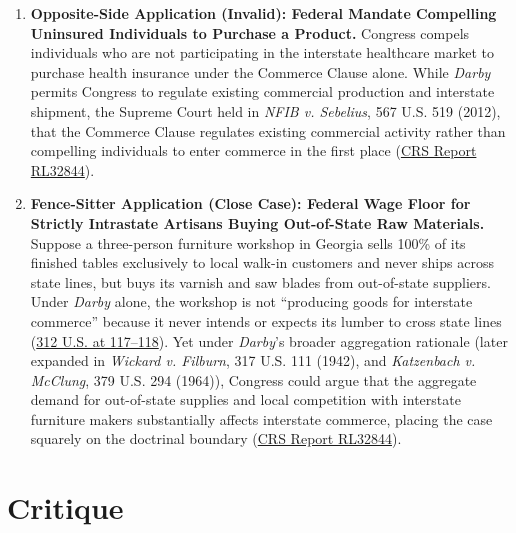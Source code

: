 \documentclass[12pt]{article}
\begin{document}
\begin{enumerate}
\item \textbf{Opposite-Side Application (Invalid): Federal Mandate Compelling Uninsured Individuals to Purchase a Product.} Congress compels individuals who are not participating in the interstate healthcare market to purchase health insurance under the Commerce Clause alone. While \textit{Darby} permits Congress to regulate existing commercial production and interstate shipment, the Supreme Court held in \textit{NFIB v. Sebelius}, 567 U.S. 519 (2012), that the Commerce Clause regulates existing commercial activity rather than compelling individuals to enter commerce in the first place (\href{https://www.everycrsreport.com/reports/RL32844.html}{CRS Report RL32844}).

\item \textbf{Fence-Sitter Application (Close Case): Federal Wage Floor for Strictly Intrastate Artisans Buying Out-of-State Raw Materials.} Suppose a three-person furniture workshop in Georgia sells 100\% of its finished tables exclusively to local walk-in customers and never ships across state lines, but buys its varnish and saw blades from out-of-state suppliers. Under \textit{Darby} alone, the workshop is not ``producing goods for interstate commerce'' because it never intends or expects its lumber to cross state lines (\href{https://supreme.justia.com/cases/federal/us/312/100/}{312 U.S. at 117--118}). Yet under \textit{Darby}'s broader aggregation rationale (later expanded in \textit{Wickard v. Filburn}, 317 U.S. 111 (1942), and \textit{Katzenbach v. McClung}, 379 U.S. 294 (1964)), Congress could argue that the aggregate demand for out-of-state supplies and local competition with interstate furniture makers substantially affects interstate commerce, placing the case squarely on the doctrinal boundary (\href{https://www.everycrsreport.com/reports/RL32844.html}{CRS Report RL32844}).
\end{enumerate}

\section{Critique}
\end{document}

